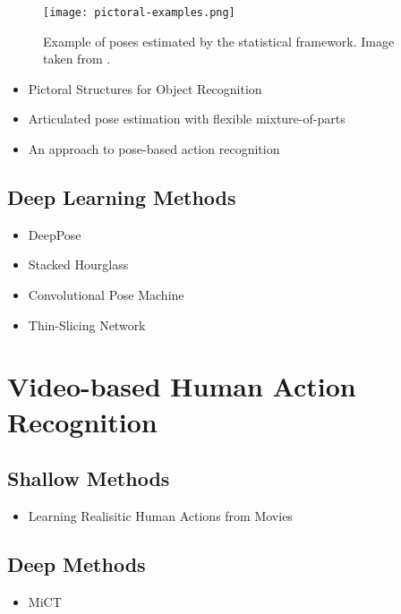 \begin{figure}[htb!]
    \centering
    \texttt{[image: pictoral-examples.png]}
    \caption{Example of poses estimated by the statistical framework. Image taken from \cite{felzenszwalb_pictorial_2005}.}
    \label{fig:pictoral-examples}
\end{figure}

\begin{itemize}
    \item Pictoral Structures for Object Recognition \cite{felzenszwalb_pictorial_2005}
    \item Articulated pose estimation with flexible mixture-of-parts \cite{yang_articulated_2011}
    \item An approach to pose-based action recognition \cite{wang_approach_2013}
\end{itemize}

\subsection{Deep Learning Methods}
\begin{itemize}
    \item DeepPose \cite{toshev_deeppose:_2014}
    \item Stacked Hourglass \cite{newell_stacked_2016}
    \item Convolutional Pose Machine \cite{wei_convolutional_2016}
    \item Thin-Slicing Network \cite{song_thin-slicing_2017}
\end{itemize}

\section{Video-based Human Action Recognition}
\subsection{Shallow Methods}
\begin{itemize}
    \item Learning Realisitic Human Actions from Movies \cite{laptev_learning_2008}
\end{itemize}

\subsection{Deep Methods}
\begin{itemize}
    \item MiCT \cite{zhou_mict:_2018}
\end{itemize}